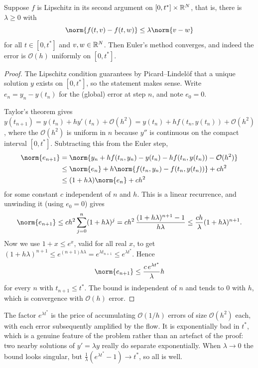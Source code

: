 \documentclass[a4paper]{scrartcl}
\begin{document}
\begin{theorem}\label{thm:eulerconv}
  Suppose $f$ is Lipschitz in its second argument on $[0,t^*] \times \mathbb{R}^N$, that is, there is $\lambda \geq 0$ with
  $$
  \norm{f(t,v) - f(t,w)} \leq \lambda \norm{v - w}
  $$
  for all $t \in [0,t^*]$ and $v, w \in \mathbb{R}^N$. Then Euler's method converges, and indeed the error is $\mathcal{O}(h)$ uniformly on $[0,t^*]$.
\end{theorem}
\begin{proof}
  The Lipschitz condition guarantees by Picard--Lindel\"of that a unique solution $y$ exists on $[0, t^*]$, so the statement makes sense. Write $e_n = y_n - y(t_n)$ for the (global) error at step $n$, and note $e_0 = 0$.

  Taylor's theorem gives $y(t_{n+1}) = y(t_n) + hy'(t_n) + \mathcal{O}(h^2) = y(t_n) + hf(t_n, y(t_n)) + \mathcal{O}(h^2)$, where the $\mathcal{O}(h^2)$ is uniform in $n$ because $y''$ is continuous on the compact interval $[0,t^*]$. Subtracting this from the Euler step,
  \begin{align*}
    \norm{e_{n+1}} &= \norm{y_n + hf(t_n,y_n) - y(t_n) - hf(t_n, y(t_n)) - \mathcal{O}(h^2)}\\
    &\leq \norm{e_n} + h\norm{f(t_n,y_n) - f(t_n,y(t_n))} + ch^2\\
    &\leq (1 + h\lambda)\norm{e_n} + ch^2
  \end{align*}
  for some constant $c$ independent of $n$ and $h$. This is a linear recurrence, and unwinding it (using $e_0 = 0$) gives
  $$
  \norm{e_{n+1}} \leq ch^2\sum_{j=0}^{n}(1+h\lambda)^j = ch^2\,\frac{(1+h\lambda)^{n+1} - 1}{h\lambda} \leq \frac{ch}{\lambda}(1 + h\lambda)^{n+1}.
  $$
  Now we use $1 + x \leq e^x$, valid for all real $x$, to get $(1+h\lambda)^{n+1} \leq e^{(n+1)h\lambda} = e^{\lambda t_{n+1}} \leq e^{\lambda t^*}$. Hence
  $$
  \norm{e_{n+1}} \leq \frac{c\,e^{\lambda t^*}}{\lambda}h
  $$
  for every $n$ with $t_{n+1} \le t^*$. The bound is independent of $n$ and tends to $0$ with $h$, which is convergence with $\mathcal{O}(h)$ error.
\end{proof}

\begin{remark}
  The factor $e^{\lambda t^*}$ is the price of accumulating $\mathcal{O}(1/h)$ errors of size $\mathcal{O}(h^2)$ each, with each error subsequently amplified by the flow. It is exponentially bad in $t^*$, which is a genuine feature of the problem rather than an artefact of the proof: two nearby solutions of $y' = \lambda y$ really do separate exponentially. When $\lambda \to 0$ the bound looks singular, but $\frac{1}{\lambda}(e^{\lambda t^*} - 1) \to t^*$, so all is well.
\end{remark}
\end{document}
